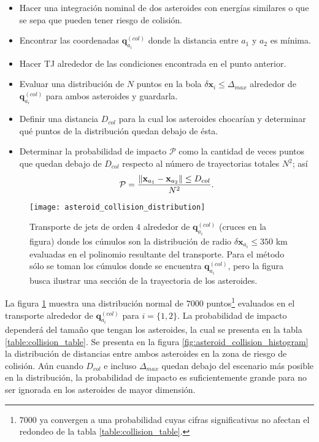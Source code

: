 \begin{itemize}
 \item Hacer una integración nominal de dos asteroides con energías similares o que se sepa que pueden tener riesgo de colisión.
 
 \item Encontrar las coordenadas $\mathbf{q}_{a_i}^{(col)}$ donde la distancia entre $a_1$ y $a_2$ es mínima.
 
 \item Hacer TJ alrededor de las condiciones encontrada en el punto anterior.
 
 \item Evaluar una distribución de $N$ puntos en la bola $\delta\mathbf{x}_i \leq \Delta_{max}$ alrededor de $\mathbf{q}_{a_i}^{(col)}$ para ambos asteroides y guardarla.
 
 \item Definir una distancia $D_{col}$ para la cual los asteroides chocarían y determinar qué puntos de la distribución quedan debajo de ésta.
 
 \item Determinar la probabilidad de impacto $\mathcal{P}$ como la cantidad de veces puntos que quedan debajo de $D_{col}$ respecto al número de trayectorias totales $N^2$; así
 \begin{equation} 
 \mathcal{P} = \frac{\left\lVert\mathbf{x}_{a_1} - \mathbf{x}_{a_2} \right\rVert    \leq D_{col} }{N^2}.
 \end{equation}
\end{itemize}

\begin{figure}
 \centering
 \texttt{[image: asteroid\_collision\_distribution]}
 \caption{Transporte de jets de orden $4$ alrededor de $\mathbf{q}_{a_i}^{(col)}$ (cruces en la figura) donde los cúmulos son la distribución de radio $\delta\mathbf{x}_{a_i} \leq 350$ km evaluadas en el polinomio resultante del transporte. Para el método sólo se toman los cúmulos donde se encuentra $\mathbf{q}_{a_i}^{(col)}$, pero la figura busca ilustrar una sección de la trayectoria de los asteroides.}
 \label{fig:asteroid_collision_distribution}
\end{figure}

La figura \ref{fig:asteroid_collision_distribution} muestra una distribución normal de $7000$ puntos\footnote{$7000$ ya convergen a una probabilidad cuyas cifras significativas no afectan el redondeo de la tabla \ref{table:collision_table}.} evaluados en el transporte alrededor de $\mathbf{q}_{a_i}^{(col)}$ para $i = \{1,2\}$. La probabilidad de impacto dependerá del tamaño que tengan los asteroides, la cual se presenta en la tabla \ref{table:collision_table}. Se presenta en la figura \ref{fig:asteroid_collision_histogram} la distribución de distancias entre ambos asteroides en la zona de riesgo de colisión. Aún cuando $D_{col}$ e incluso $\Delta_{max}$ quedan debajo del escenario más posible en la distribución, la probabilidad de impacto es suficientemente grande para no ser ignorada en los asteroides de mayor dimensión.

